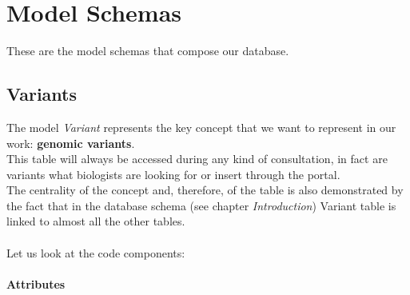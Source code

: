 
\section{Model Schemas}
These are the model schemas that compose our database.


\subsection{Variants}
The model \emph{Variant} represents the key concept that we want to represent in our work: \textbf{genomic variants}.
\\This table will always be accessed during any kind of consultation, in fact are variants what biologists are looking for or insert through the portal.
\\The centrality of the concept and, therefore, of the table is also demonstrated by the fact that in the database schema (see chapter \emph{Introduction}) Variant table is linked to almost all the other tables.
\\
\\Let us look at the code components:

\newpage

\paragraph{Attributes}      

